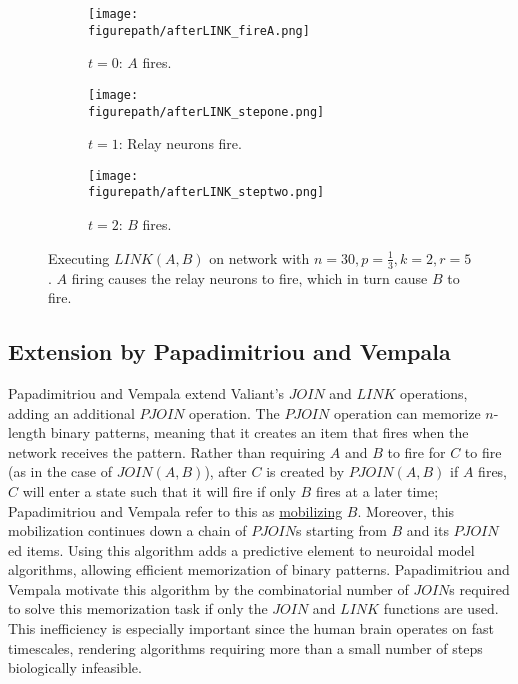 \documentclass[letterpaper, 12pt]{article}
\newcommand{\figurepath}{../../Figures}
\begin{document}
\begin{figure}[!htb]
\centering
\begin{subfigure}[b]{0.3\textwidth}
      \texttt{[image: \\figurepath/afterLINK\_fireA.png]}
      \caption*{$t=0$: $A$ fires.}
\end{subfigure}
\begin{subfigure}[b]{0.3\textwidth}
      \texttt{[image: \\figurepath/afterLINK\_stepone.png]}
      \caption*{$t=1$: Relay neurons fire.}
\end{subfigure}
\begin{subfigure}[b]{0.3\textwidth}
      \texttt{[image: \\figurepath/afterLINK\_steptwo.png]}
      \caption*{$t=2$: $B$ fires.}
\end{subfigure}
\caption{Executing $LINK(A,B)$ on network with $n=30,p=\frac{1}{3},k=2,r=5$. $A$ firing causes the relay neurons to fire, which in turn cause $B$ to fire.}\label{fig:executingLINK}
\end{figure}

\subsection{Extension by Papadimitriou and Vempala}\label{sec:pjoin}
Papadimitriou and Vempala \cite{papadimitriou_cortical_2015} extend Valiant's $JOIN$ and $LINK$ operations, adding an additional $PJOIN$ operation. The $PJOIN$ operation can memorize $n$-length binary patterns, meaning that it creates an item that fires when the network receives the pattern. Rather than requiring $A$ and $B$ to fire for $C$ to fire (as in the case of $JOIN(A, B)$), after $C$ is created by $PJOIN(A,B)$ if $A$ fires, $C$ will enter a state such that it will fire if only $B$ fires at a later time; Papadimitriou and Vempala refer to this as \underline{mobilizing} $B$. Moreover, this mobilization continues down a chain of $PJOIN$s starting from $B$ and its $PJOIN$ed items. Using this algorithm adds a predictive element to neuroidal model algorithms, allowing efficient memorization of binary patterns. Papadimitriou and Vempala motivate this algorithm by the combinatorial number of $JOIN$s required to solve this memorization task if only the $JOIN$ and $LINK$ functions are used. This inefficiency is especially important since the human brain operates on fast timescales, rendering algorithms requiring more than a small number of steps biologically infeasible.
\end{document}
